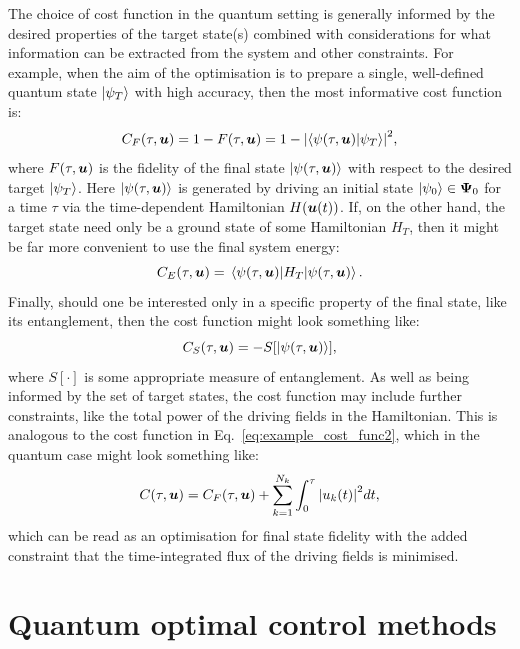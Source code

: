 The choice of cost function in the quantum setting is generally informed by the desired properties of the target state(s) combined with considerations for what information can be extracted from the system and other constraints. For example, when the aim of the optimisation is to prepare a single, well-defined quantum state $\ket{\psi_T}$ with high accuracy, then the most informative cost function is:
\begin{equation}\label{eq:costfunc_fidelity}
    C_F(\tau, \boldsymbol{u}) = 1 - F(\tau, \boldsymbol{u}) = 1 - \abs{\braket{\psi(\tau, \boldsymbol{u})}{\psi_T}}^2,
\end{equation}
where $F(\tau, \boldsymbol{u})$ is the fidelity of the final state $\ket{\psi(\tau, \boldsymbol{u})}$ with respect to the desired target $\ket{\psi_T}$. Here $\ket{\psi(\tau, \boldsymbol{u})}$ is generated by driving an initial state $\ket{\psi_0} \in \boldsymbol \Psi_0$ for a time $\tau$ via the time-dependent Hamiltonian $H(\boldsymbol{u}(t))$. If, on the other hand, the target state need only be a ground state of some Hamiltonian $H_T$, then it might be far more convenient to use the final system energy:
\begin{equation}\label{eq:costfunc_energy}
    C_E(\tau, \boldsymbol{u}) = \mel{\psi(\tau, \boldsymbol{u})}{H_T}{\psi(\tau, \boldsymbol{u})}.
\end{equation}
Finally, should one be interested only in a specific property of the final state, like its entanglement, then the cost function might look something like:
\begin{equation}\label{eq:costfunc_entanglement}
    C_S(\tau, \boldsymbol{u}) = -S[\ket{\psi(\tau, \boldsymbol{u})}],
\end{equation}
where $S[\cdot]$ is some appropriate measure of entanglement.  As well as being informed by the set of target states, the cost function may include further constraints, like the total power of the driving fields in the Hamiltonian. This is analogous to the cost function in Eq.~\eqref{eq:example_cost_func2}, which in the quantum case might look something like:
\begin{equation}\label{eq:costfunc_constraint}
    C(\tau, \boldsymbol{u}) = C_F(\tau, \boldsymbol{u}) + \sum_{k = 1}^{N_k} \int_0^{\tau} \abs{u_k(t)}^2 dt,
\end{equation}
which can be read as an optimisation for final state fidelity with the added constraint that the time-integrated flux of the driving fields is minimised. 


\section{Quantum optimal control methods}

